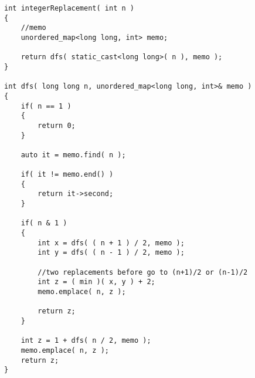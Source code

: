\setcounter{lstlisting}{0}
\begin{lstlisting}[style=customc, caption={Top Down Dynamic Programming}]
int integerReplacement( int n )
{
    //memo
    unordered_map<long long, int> memo;

    return dfs( static_cast<long long>( n ), memo );
}

int dfs( long long n, unordered_map<long long, int>& memo )
{
    if( n == 1 )
    {
        return 0;
    }

    auto it = memo.find( n );

    if( it != memo.end() )
    {
        return it->second;
    }

    if( n & 1 )
    {
        int x = dfs( ( n + 1 ) / 2, memo );
        int y = dfs( ( n - 1 ) / 2, memo );

        //two replacements before go to (n+1)/2 or (n-1)/2
        int z = ( min )( x, y ) + 2;
        memo.emplace( n, z );

        return z;
    }

    int z = 1 + dfs( n / 2, memo );
    memo.emplace( n, z );
    return z;
}
\end{lstlisting}